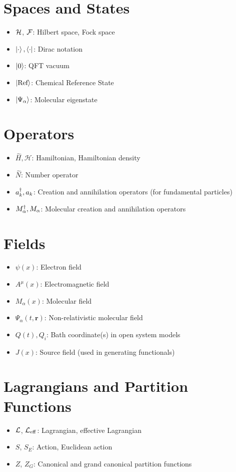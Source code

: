 \section{Spaces and States}
\begin{itemize}
	\item \(\mathcal{H}\), \(\mathcal{F}\): Hilbert space, Fock space
	\item \(\ket{\cdot}, \bra{\cdot}\): Dirac notation
	\item \(\ket{0}\): QFT vacuum
	\item \(\ket{\text{Ref}}\): Chemical Reference State
	\item \(\ket{\Psi_\alpha}\): Molecular eigenstate
\end{itemize}

\section{Operators}
\begin{itemize}
	\item \(\hat{H}, \mathcal{H}\): Hamiltonian, Hamiltonian density
	\item \(\hat{N}\): Number operator
	\item \(a^\dagger_{k}, a_{k}\): Creation and annihilation operators (for fundamental particles)
	\item \(M^\dagger_{\alpha}, M_{\alpha}\): Molecular creation and annihilation operators
\end{itemize}

\section{Fields}
\begin{itemize}
	\item \(\psi(x)\): Electron field
	\item \(A^\mu(x)\): Electromagnetic field
	\item \(M_\alpha(x)\): Molecular field
	\item \(\Psi_\alpha(t, \mathbf{r})\): Non-relativistic molecular field
	\item \(Q(t), Q_i\): Bath coordinate(s) in open system models
	\item \(J(x)\): Source field (used in generating functionals)
\end{itemize}

\section{Lagrangians and Partition Functions}
\begin{itemize}
	\item \(\mathcal{L}\), \(\mathcal{L}_{\mathrm{eff}}\): Lagrangian, effective Lagrangian
	\item \(S\), \(S_E\): Action, Euclidean action
	\item \(Z\), \(Z_G\): Canonical and grand canonical partition functions
\end{itemize}

